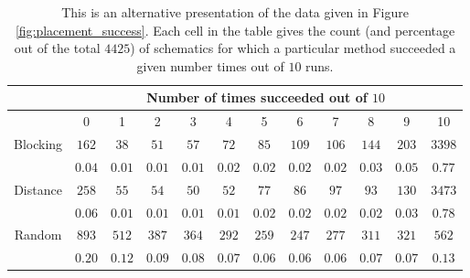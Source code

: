 \begin{table}[H]
\begin{center}
\begin{singlespace}
\begin{tabular}{|c||c|c|c|c|c|c|c|c|c|c|c|}
\hline
 & \multicolumn{11}{|c|}{Number of times succeeded out of $10$} \\
\hline
 & 0 & 1 & 2 & 3 & 4 & 5 & 6 & 7 & 8 & 9 & 10 \\
\hline\hline
Blocking & $162$ & $38$ & $51$ & $57$ & $72$ & $85$ & $109$ & $106$ & $144$ & $203$ & $3398$ \\
 & $0.04$ & $0.01$ & $0.01$ & $0.01$ & $0.02$ & $0.02$ & $0.02$ & $0.02$ & $0.03$ & $0.05$ & $0.77$ \\
\hline
 Distance & $258$ & $55$ & $54$ & $50$ & $52$ & $77$ & $86$ & $97$ & $93$ & $130$ & $3473$ \\
  & $0.06$ & $0.01$ & $0.01$ & $0.01$ & $0.01$ & $0.02$ & $0.02$ & $0.02$ & $0.02$ & $0.03$ & $0.78$ \\
\hline
  Random & $893$ & $512$ & $387$ & $364$ & $292$ & $259$ & $247$ & $277$ & $311$ & $321$ & $562$ \\
   & $0.20$ & $0.12$ & $0.09$ & $0.08$ & $0.07$ & $0.06$ & $0.06$ & $0.06$ & $0.07$ & $0.07$ & $0.13$ \\
\hline
\end{tabular}
\end{singlespace}
\end{center}
\caption[Placement method success rate comparison]{This is an alternative
presentation of the data given in Figure \ref{fig:placement_success}. Each cell
in the table gives the count (and percentage out of the total $4425$)
of schematics for which a
particular method succeeded a given number times out of $10$ runs.}
\label{tb:placement_success}
\end{table}

